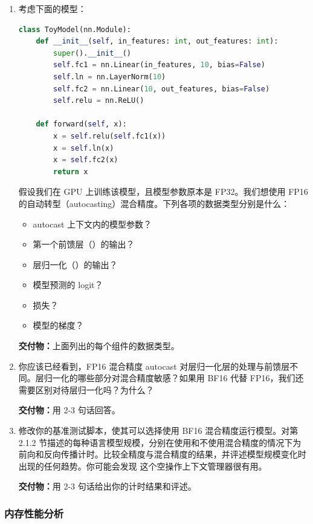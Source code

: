 \begin{enumerate}[label=(\alph*)]
  \item 考虑下面的模型：

\begin{lstlisting}[language=Python]
class ToyModel(nn.Module):
    def __init__(self, in_features: int, out_features: int):
        super().__init__()
        self.fc1 = nn.Linear(in_features, 10, bias=False)
        self.ln = nn.LayerNorm(10)
        self.fc2 = nn.Linear(10, out_features, bias=False)
        self.relu = nn.ReLU()

    def forward(self, x):
        x = self.relu(self.fc1(x))
        x = self.ln(x)
        x = self.fc2(x)
        return x
\end{lstlisting}

  假设我们在 GPU 上训练该模型，且模型参数原本是 FP32。我们想使用 FP16 的自动转型（autocasting）混合精度。下列各项的数据类型分别是什么：

  \begin{itemize}
    \item autocast 上下文内的模型参数？
    \item 第一个前馈层（）的输出？
    \item 层归一化（）的输出？
    \item 模型预测的 logit？
    \item 损失？
    \item 模型的梯度？
  \end{itemize}

  \textbf{交付物：}上面列出的每个组件的数据类型。

  \item 你应该已经看到，FP16 混合精度 autocast 对层归一化层的处理与前馈层不同。层归一化的哪些部分对混合精度敏感？如果用 BF16 代替 FP16，我们还需要区别对待层归一化吗？为什么？

  \textbf{交付物：}用 2-3 句话回答。

  \item 修改你的基准测试脚本，使其可以选择使用 BF16 混合精度运行模型。对第 2.1.2 节描述的每种语言模型规模，分别在使用和不使用混合精度的情况下为前向和反向传播计时。比较全精度与混合精度的结果，并评述模型规模变化时出现的任何趋势。你可能会发现  这个空操作上下文管理器很有用。

  \textbf{交付物：}用 2-3 句话给出你的计时结果和评述。
\end{enumerate}

\subsubsection{内存性能分析}

